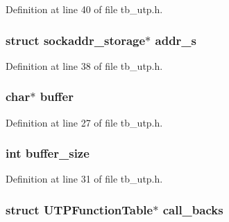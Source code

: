 Definition at line 40 of file tb\-\_\-utp.\-h.

\hypertarget{structtb__utp__t_a6c6b934648a67540d62892076f229e35}{
\subsubsection[{addr\-\_\-s}]{\setlength{\rightskip}{0pt plus 5cm}struct sockaddr\-\_\-storage$\ast$ addr\-\_\-s}}\label{structtb__utp__t_a6c6b934648a67540d62892076f229e35}


Definition at line 38 of file tb\-\_\-utp.\-h.

\hypertarget{structtb__utp__t_aff2566f4c366b48d73479bef43ee4d2e}{
\subsubsection[{buffer}]{\setlength{\rightskip}{0pt plus 5cm}char$\ast$ buffer}}\label{structtb__utp__t_aff2566f4c366b48d73479bef43ee4d2e}


Definition at line 27 of file tb\-\_\-utp.\-h.

\hypertarget{structtb__utp__t_af22ff4ab7a026e6c3b4b08eafb2df027}{
\subsubsection[{buffer\-\_\-size}]{\setlength{\rightskip}{0pt plus 5cm}int buffer\-\_\-size}}\label{structtb__utp__t_af22ff4ab7a026e6c3b4b08eafb2df027}


Definition at line 31 of file tb\-\_\-utp.\-h.

\hypertarget{structtb__utp__t_af8b7b669057336d848a5117e4232a83a}{
\subsubsection[{call\-\_\-backs}]{\setlength{\rightskip}{0pt plus 5cm}struct U\-T\-P\-Function\-Table$\ast$ call\-\_\-backs}}\label{structtb__utp__t_af8b7b669057336d848a5117e4232a83a}


